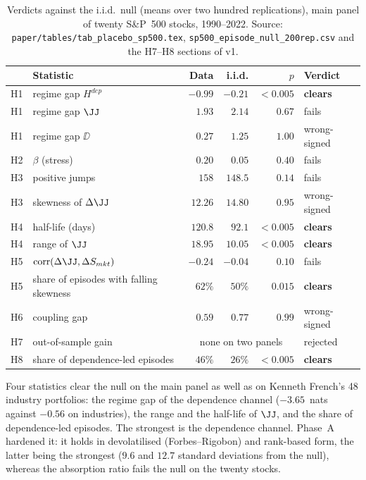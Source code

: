 \begin{table}[htbp]
\centering
\small
\begin{tabular}{@{}llrrrl@{}}
\toprule
& Statistic & Data & i.i.d. & $p$ & Verdict \\
\midrule
H1 & regime gap $H^{dep}$ & $-0.99$ & $-0.21$ & $<0.005$ & \textbf{clears} \\
H1 & regime gap $\JJ$ & $1.93$ & $2.14$ & $0.67$ & fails \\
H1 & regime gap $\DD$ & $0.27$ & $1.25$ & $1.00$ & wrong-signed \\
H2 & $\beta$ (stress) & $0.20$ & $0.05$ & $0.40$ & fails \\
H3 & positive jumps & $158$ & $148.5$ & $0.14$ & fails \\
H3 & skewness of $\Delta\JJ$ & $12.26$ & $14.80$ & $0.95$ & wrong-signed \\
H4 & half-life (days) & $120.8$ & $92.1$ & $<0.005$ & \textbf{clears} \\
H4 & range of $\JJ$ & $18.95$ & $10.05$ & $<0.005$ & \textbf{clears} \\
H5 & $\mathrm{corr}(\Delta\JJ,\Delta S_{mkt})$ & $-0.24$ & $-0.04$ & $0.10$ & fails \\
H5 & share of episodes with falling skewness & $62\%$ & $50\%$ & $0.015$ & \textbf{clears} \\
H6 & coupling gap & $0.59$ & $0.77$ & $0.99$ & wrong-signed \\
H7 & out-of-sample gain & \multicolumn{3}{c}{none on two panels} & rejected \\
H8 & share of dependence-led episodes & $46\%$ & $26\%$ & $<0.005$ & \textbf{clears} \\
\bottomrule
\end{tabular}
\caption{Verdicts against the i.i.d.\ null (means over two hundred replications),
main panel of twenty S\&P~500 stocks, 1990--2022. Source:
\texttt{paper/tables/tab\_placebo\_sp500.tex}, \texttt{sp500\_episode\_null\_200rep.csv}
and the H7--H8 sections of v1.}
\label{tab:program}
\end{table}

Four statistics clear the null on the main panel as well as on Kenneth
French's 48 industry portfolios: the regime gap of the dependence channel
($-3.65$~nats against $-0.56$ on industries), the range and the half-life of
$\JJ$, and the share of dependence-led episodes. The strongest is the
dependence channel. Phase~A hardened it: it holds in devolatilised
(Forbes--Rigobon) and rank-based form, the latter being the strongest ($9.6$
and $12.7$ standard deviations from the null), whereas the
\citet{kritzman2011} absorption ratio fails the null on the twenty stocks.

